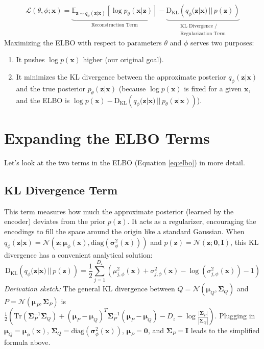 \documentclass[11pt, letterpaper]{article}
\newcommand{\vx}{\boldsymbol{x}} %
\newcommand{\vz}{\boldsymbol{z}} %
\newcommand{\vmu}{\boldsymbol{\mu}} %
\newcommand{\vsigma}{\boldsymbol{\sigma}} %
\newcommand{\mI}{\boldsymbol{I}} %
\newcommand{\mSigma}{\boldsymbol{\Sigma}} %
\newcommand{\E}{\mathbb{E}} %
\newcommand{\KL}[2]{\text{D}_{\text{KL}}\left(#1 \,||\, #2\right)} %
\newcommand{\Ndist}{\mathcal{N}} %
\begin{document}
\begin{equation}
    \mathcal{L}(\theta, \phi; \vx) = \underbrace{\E_{\vz \sim q_{\phi}(\vz|\vx)} \left[ \log p_{\theta}(\vx|\vz) \right]}_{\text{Reconstruction Term}} - \underbrace{\KL{q_{\phi}(\vz|\vx)}{p(\vz)}}_{\substack{\text{KL Divergence /} \\ \text{Regularization Term}}}
    \label{eq:elbo}
\end{equation}
Maximizing the ELBO with respect to parameters $\theta$ and $\phi$ serves two purposes:
\begin{enumerate}
    \item It pushes $\log p(\vx)$ higher (our original goal).
    \item It minimizes the KL divergence between the approximate posterior $q_{\phi}(\vz|\vx)$ and the true posterior $p_{\theta}(\vz|\vx)$ (because $\log p(\vx)$ is fixed for a given $\vx$, and the ELBO is $\log p(\vx) - \KL{q_{\phi}(\vz|\vx)}{p_{\theta}(\vz|\vx)}$).
\end{enumerate}

\section{Expanding the ELBO Terms}

Let's look at the two terms in the ELBO (Equation \ref{eq:elbo}) in more detail.

\subsection{KL Divergence Term}
This term measures how much the approximate posterior (learned by the encoder) deviates from the prior $p(\vz)$. It acts as a regularizer, encouraging the encodings to fill the space around the origin like a standard Gaussian.
When $q_{\phi}(\vz|\vx) = \Ndist(\vz; \vmu_{\phi}(\vx), \text{diag}(\vsigma^2_{\phi}(\vx)))$ and $p(\vz) = \Ndist(\vz; \mathbf{0}, \mI)$, this KL divergence has a convenient analytical solution:
\begin{equation}
    \KL{q_{\phi}(\vz|\vx)}{p(\vz)} = \frac{1}{2} \sum_{j=1}^{D_z} \left( \mu_{j, \phi}^2(\vx) + \sigma_{j, \phi}^2(\vx) - \log(\sigma_{j, \phi}^2(\vx)) - 1 \right)
    \label{eq:kl_gaussian}
\end{equation}
\emph{Derivation sketch:} The general KL divergence between $Q = \Ndist(\vmu_Q, \mSigma_Q)$ and $P = \Ndist(\vmu_P, \mSigma_P)$ is $\frac{1}{2} \left( \text{Tr}(\mSigma_P^{-1} \mSigma_Q) + (\vmu_P - \vmu_Q)^T \mSigma_P^{-1} (\vmu_P - \vmu_Q) - D_z + \log \frac{|\mSigma_P|}{|\mSigma_Q|} \right)$. Plugging in $\vmu_Q = \vmu_{\phi}(\vx)$, $\mSigma_Q = \text{diag}(\vsigma^2_{\phi}(\vx))$, $\vmu_P = \mathbf{0}$, and $\mSigma_P = \mI$ leads to the simplified formula above.
\end{document}

